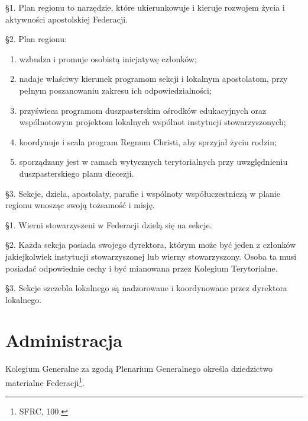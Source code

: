 
 \S{}1. Plan regionu to narzędzie, które ukierunkowuje i kieruje rozwojem życia i aktywności apostolskiej Federacji.

\S{}2. Plan regionu:
\begin{enumerate}
	
	\item wzbudza i promuje osobistą inicjatywę członków;
	
	\item nadaje właściwy kierunek programom sekcji i lokalnym apostolatom, przy pełnym poszanowaniu zakresu ich odpowiedzialności;
	
	\item przyświeca programom duszpasterskim ośrodków edukacyjnych oraz wspólnotowym projektom lokalnych wspólnot instytucji stowarzyszonych;
	
	\item koordynuje i scala program Regnum Christi, aby sprzyjał życiu rodzin;
	
	\item sporządzany jest w ramach wytycznych terytorialnych przy uwzględnieniu duszpasterskiego planu diecezji.
\end{enumerate}

\S{}3. Sekcje, dzieła, apostolaty, parafie i wspólnoty współuczestniczą w planie regionu wnosząc swoją tożsamość i misję.


 \S{}1. Wierni stowarzyszeni w Federacji dzielą się na sekcje.

\S{}2. Każda sekcja posiada swojego dyrektora, którym może być jeden z członków jakiejkolwiek instytucji stowarzyszonej lub wierny stowarzyszony. Osoba ta musi posiadać odpowiednie cechy i być mianowana przez Kolegium Terytorialne.

\S{}3. Sekcje szczebla lokalnego są nadzorowane i koordynowane przez dyrektora lokalnego.

\chapter{Administracja}


 Kolegium Generalne za zgodą Plenarium Generalnego określa dziedzictwo materialne Federacji\footnote{SFRC, 100.}.


